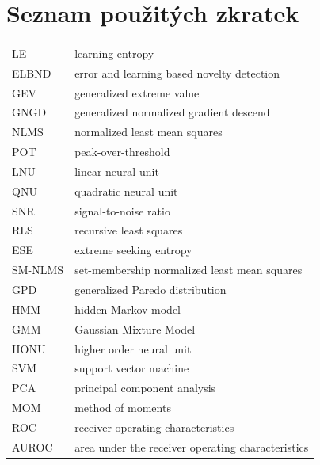 
\cleardoublepage
\thispagestyle{empty}

\chapter*{Seznam použitých zkratek}
\begin{tabular}{ll}
LE                      & learning entropy                              \\
ELBND                   & error and learning based novelty detection      \\
GEV                     & generalized extreme value                       \\
GNGD                    & generalized normalized gradient descend         \\
NLMS                    & normalized least mean squares                   \\
POT                     & peak-over-threshold                             \\
LNU                     & linear neural unit                              \\
QNU                     & quadratic neural unit                           \\
SNR                     & signal-to-noise ratio                           \\
RLS                     & recursive least squares                         \\
ESE                     & extreme seeking entropy                         \\
SM-NLMS                 & set-membership normalized least mean squares \\
GPD						& generalized Paredo distribution \\
HMM						& hidden Markov model \\
GMM						& Gaussian Mixture Model \\
HONU					& higher order neural unit \\
SVM						& support vector machine \\
PCA						& principal component analysis \\
MOM						& method of moments \\
ROC						& receiver operating characteristics \\
AUROC					& area under the receiver operating characteristics\\



\end{tabular}

